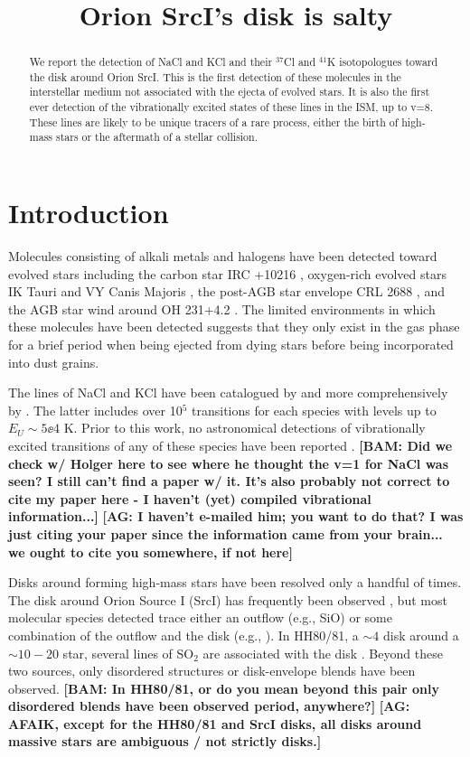 \documentclass[twocolumn]{aastex62}
\newcommand{\sourcei}{SrcI\xspace}
\newcommand{\bam}[1]{\textcolor{green!65!black}{\textbf{[BAM: #1]}}}
\newcommand{\ag}[1]{\textcolor{red!65!black}{\textbf{[AG: #1]}}}
\begin{document}


\title{Orion \sourcei's disk is salty}
\begin{abstract}
    We report the detection of NaCl and KCl and their $^{37}$Cl and $^{41}$K
    isotopologues toward the disk around Orion \sourcei.
    This is the first detection of these molecules in the interstellar
    medium not associated with the ejecta of evolved stars.  It is also
    the first ever detection of the vibrationally excited states of these
    lines in the ISM, up to v=8.
    These lines are likely to be unique tracers of a rare process, either
    the birth of high-mass stars or the aftermath of a stellar collision.
\end{abstract}

\section{Introduction}
Molecules consisting of alkali metals and halogens have been detected
toward evolved stars including the carbon star IRC +10216 \citep{Cernicharo1987a},
oxygen-rich evolved stars IK Tauri and VY Canis Majoris \citep{Milam2007a},
the post-AGB star envelope CRL 2688 \citep{Highberger2003a},
and the AGB star wind around OH 231+4.2 \citep{Sanchez-Contreras2018a}.
The limited environments in which these molecules have been detected
suggests that they only exist in the gas phase for a brief period
when being ejected from dying stars before being incorporated into
dust grains.

The lines of NaCl and KCl have been catalogued by \citet{Caris2004a} and more
comprehensively by \citet{Barton2014a}.  The latter includes over 10$^5$
transitions for each species with levels up to $E_U\sim5\ee{4}$ K.  Prior to
this work, no astronomical detections of vibrationally excited transitions of
any of these species have been reported \citep[e.g., see the review
by][]{McGuire2018a}. \bam{Did we check w/ Holger here to see where he thought
the v=1 for NaCl was seen?  I still can't find a paper w/ it.  It's also
probably not correct to cite my paper here - I haven't (yet) compiled
vibrational information...} \ag{I haven't e-mailed him; you want to do that?
I was just citing your paper since the information came from your brain...
we ought to cite you somewhere, if not here}

Disks around forming high-mass stars have been resolved only a handful of
times.  The disk around Orion Source I (\sourcei) has frequently been observed
\citep{Hirota2014a,Plambeck2016a,Ginsburg2018b}, but most molecular species
detected trace either an outflow (e.g., SiO) or some combination of the outflow
and the disk (e.g., \water).  In HH80/81, a $\sim4$ \msun disk around a
$\sim10-20$ \msun star, several lines of SO$_2$ are associated with the disk
\citep{Girart2017a}.  Beyond these two sources, only disordered structures or
disk-envelope blends have been observed. \bam{In HH80/81, or do you mean beyond
this pair only disordered blends have been observed period, anywhere?}
\ag{AFAIK, except for the HH80/81 and \sourcei disks, all disks around massive
stars are ambiguous / not strictly disks.}
\end{document}
